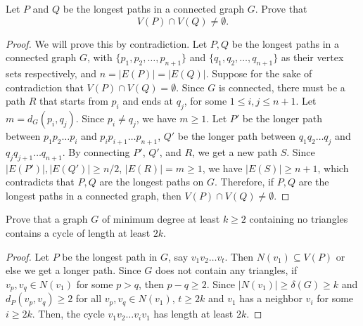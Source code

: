 \documentclass{article}
\newenvironment{problem}[2][Question]{\begin{trivlist}
\item[\hskip \labelsep {\bfseries #1}\hskip \labelsep {\bfseries #2.}]}{\end{trivlist}}
\begin{document}
\begin{problem}{4}
     Let $P$ and $Q$ be the longest paths in a connected graph $G$. Prove that
     \[V(P) \cap V(Q) \neq \emptyset.\]
\end{problem}
\begin{proof}
    We will prove this by contradiction. Let $P, Q$ be the longest paths in a connected graph $G$, with $\{p_1, p_2, \dots, p_{n+1}\}$ and $\{q_1, q_2, \dots, q_{n+1}\}$ as their vertex sets respectively, and $n = |E(P)| = |E(Q)|$.  Suppose for the sake of contradiction that $V(P) \cap V(Q) = \emptyset$. Since $G$ is connected, there must be a path $R$ that starts from $p_i$ and ends at $q_j$, for some $1 \leq i, j \leq n + 1$. Let $m = d_G(p_i, q_j)$. Since $p_i \neq q_j$, we have $m \geq 1$. Let $P'$ be the longer path between $p_1p_2\dots p_i$ and $p_ip_{i+1}\dots p_{n+1}$, $Q'$ be the longer path between $q_1q_2\dots q_j$ and $q_jq_{j+1}\dots q_{n+1}$. By connecting $P'$, $Q'$, and $R$, we get a new path $S$. Since $|E(P')|, |E(Q')| \geq n/2$, $|E(R)| = m \geq 1$, we have $|E(S)| \geq n + 1$, which contradicts that $P, Q$ are the longest paths on $G$. Therefore, if $P, Q$ are the longest paths in a connected graph, then $V(P) \cap V(Q) \neq \emptyset$.
\end{proof}

\newpage

\begin{problem}{5}
    Prove that a graph $G$ of minimum degree at least $k \geq 2$ containing no triangles contains a cycle of length at least $2k$.
\end{problem}
\begin{proof}
    Let $P$ be the longest path in $G$, say $v_1v_2\dots v_t$. Then $N(v_1) \subseteq V(P)$ or else we get a longer path. Since $G$ does not contain any triangles, if $v_p, v_q \in N(v_1)$ for some $p > q$, then $p - q \geq 2$. Since $|N(v_1)| \geq \delta(G) \geq k$ and $d_P(v_p, v_q) \geq 2$ for all $v_p, v_q \in N(v_1)$, $t \geq 2k$ and $v_1$ has a neighbor $v_i$ for some $i \geq 2k$. Then, the cycle $v_1 v_2 \dots v_i v_1$ has length at least $2k$.
\end{proof}
\end{document}

